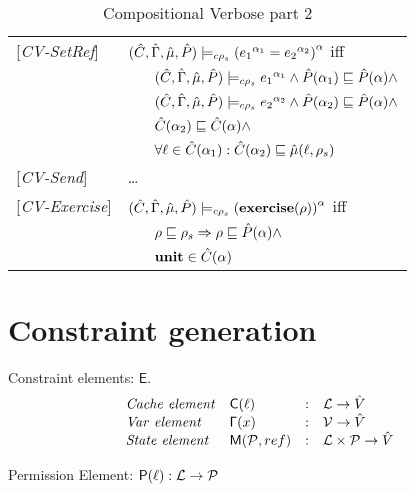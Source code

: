 \begin{table}[tlb]
\begin{tabular} {l l l l}
{[\textit{CV-SetRef}]}&\multicolumn{3}{l}{$(\hat{C},\hat{\Gamma},\hat{\mu},\hat{P}) \models_{c \rho_s} {({e_1}^{\alpha_1} = {e_2}^{\alpha_2})}^{\alpha} $ iff}\\
&&\multicolumn{2}{l}{$ (\hat{C},\hat{\Gamma},\hat{\mu},\hat{P}) \models_{c \rho_s} {e_1}^{\alpha_1} \wedge \hat{P}(\alpha_1) \sqsubseteq \hat{P}(\alpha) \wedge $}\\
&&\multicolumn{2}{l}{$ (\hat{C},\hat{\Gamma},\hat{\mu},\hat{P}) \models_{c \rho_s} {e_2}^{\alpha_2} \wedge \hat{P}(\alpha_2) \sqsubseteq \hat{P}(\alpha) \wedge $}\\
&&\multicolumn{2}{l}{$\hat{C}(\alpha_2) \sqsubseteq \hat{C}(\alpha) \wedge$} \\
&&\multicolumn{2}{l}{$ \forall \ell \in \hat{C}(\alpha_1) : \hat{C}(\alpha_2) \sqsubseteq \hat{\mu}(\ell, \rho_s)$} \\
{[\textit{CV-Send}]}& \dots \\
{[\textit{CV-Exercise}]}&\multicolumn{3}{l}{$(\hat{C},\hat{\Gamma},\hat{\mu},\hat{P}) \models_{c \rho_s} {(\mathbf{exercise}(\rho))}^{\alpha} $ iff}\\
&&\multicolumn{2}{l}{$ \rho \sqsubseteq \rho_s \Rightarrow \rho \sqsubseteq \hat{P}(\alpha) \wedge $}\\
&&\multicolumn{2}{l}{$ \mathbf{unit} \in \hat{C}(\alpha)$}\\
\end{tabular}
\caption{Compositional Verbose part 2}
\label{tab:CompVerb2}
\end{table}

\section{Constraint generation}
\label{sec:ConstraintGen}
\newcommand{\genl}[1]{\mathcal{C}_{*\rho_s}\llbracket (#1)^\all \rrbracket}
\newcommand{\gen}[1]{\mathcal{C}_{*\rho_s}\llbracket (#1) \rrbracket}
\newcommand{\Cel}{\mathsf{C}}
\newcommand{\Rel}{\mathsf{\Gamma}}
\newcommand{\Pel}{\mathsf{P}}
\newcommand{\Mel}{\mathsf{M}}
\newcommand{\El}{\mathsf{E}}
\newcommand{\braces}[1]{\{ #1 \} }
\newcommand{\parens}[1]{\( #1 \) }

Constraint elements: $\El$.
\[
\begin{array}{llcl}
\mathit{Cache\ element} & \Cel(\ell)& : & \labs \rightarrow \absvalues \\
\mathit{Var\ element} & \Rel(x) & : & \vars \rightarrow \absvalues \\
\mathit{State\ element} & \Mel(\perms, ref) & : & \labs \times \perms \rightarrow \absvalues \\
\end{array}
\]

Permission Element: $\Pel(\ell) : \labs \rightarrow \perms $


